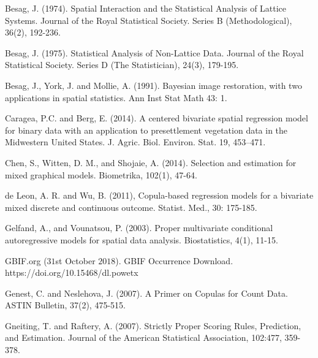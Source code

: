 \documentclass[12pt, a4paper, twoside]{article}
\begin{document}
\begin{thebibliography}{9}
	 Besag, J. (1974). Spatial Interaction and the Statistical Analysis of Lattice Systems. Journal of the Royal Statistical Society. Series B (Methodological), 36(2), 192-236. 
	
	 Besag, J. (1975). Statistical Analysis of Non-Lattice Data. Journal of the Royal Statistical Society. Series D (The Statistician), 24(3), 179-195.
	
	 Besag, J., York, J. and Mollie, A. (1991). Bayesian image restoration, with two applications in spatial statistics. Ann Inst Stat Math 43: 1.
	
	 Caragea, P.C. and Berg, E. (2014). A centered bivariate spatial regression model for binary data with an application to presettlement vegetation data in the Midwestern United States. J. Agric. Biol. Environ. Stat. 19, 453–471.
	
	 Chen, S., Witten, D. M., and Shojaie, A. (2014). Selection and estimation for mixed graphical models. Biometrika, 102(1), 47-64. 
	
	 de Leon, A. R. and Wu, B. (2011), Copula-based regression models for a bivariate mixed discrete and continuous outcome. Statist. Med., 30: 175-185.
	
	
	 Gelfand, A., and Vounatsou, P. (2003). Proper multivariate conditional autoregressive models for spatial data analysis. Biostatistics, 4(1), 11-15.
	
	 GBIF.org 	($31$st October $2018$). GBIF Occurrence Download. https://doi.org/10.15468/dl.powetx
	
	 Genest, C. and Neslehova, J. (2007). A Primer on Copulas for Count Data. ASTIN Bulletin, 37(2), 475-515.
	
	  Gneiting, T. and Raftery, A. (2007). Strictly Proper Scoring Rules, Prediction, and Estimation. Journal of the American Statistical Association, 102:477, 359-378.
	

\end{thebibliography}
\end{document}
